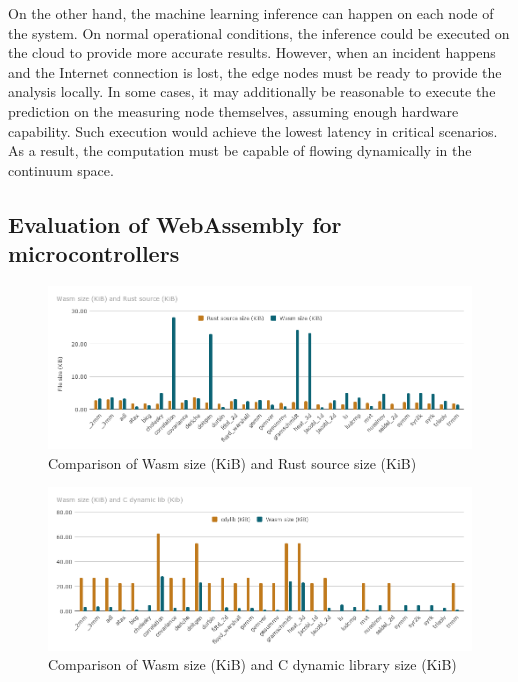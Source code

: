 On the other hand, the machine learning inference can happen on each node of the system. On normal operational conditions, the inference could be executed on the cloud to provide more accurate results. However, when an incident happens and the Internet connection is lost, the edge nodes must be ready to provide the analysis locally. In some cases, it may additionally be reasonable to execute the prediction on the measuring node themselves, assuming enough hardware capability. Such execution would achieve the lowest latency in critical scenarios. As a result, the computation must be capable of flowing dynamically in the continuum space.

\subsection{Evaluation of WebAssembly for microcontrollers}

\begin{figure}[ht]
\centering
\includegraphics[width=\columnwidth]{figures/b-wasmi-2}
\caption{Comparison of Wasm size (KiB) and Rust source size (KiB) \label{fig:b-wasmi-2}}
\end{figure}

\begin{figure}[ht]
\centering
\includegraphics[width=\columnwidth]{figures/b-wasmi-3}
\caption{Comparison of Wasm size (KiB) and C dynamic library size (KiB) \label{fig:b-wasmi-3}}
\end{figure}

